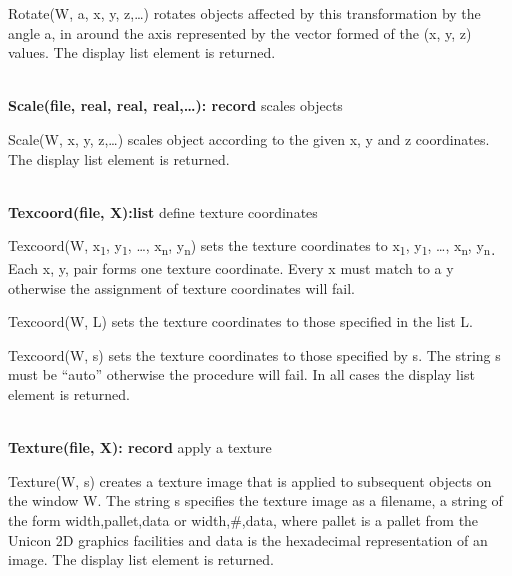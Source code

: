 \documentclass[letterpaper]{article}
\begin{document}
\bigskip

{
\textsf{Rotate(W, a, x, y, z,{\dots})} rotates objects affected by this transformation by the angle a, in around the
axis represented by the vector formed of the (x, y, z) values. The display list element is returned.}

\noindent\hrulefill\\
\noindent\textsf{\textbf{Scale(file, real, real, real,{\dots}): record}} \hfill
scales objects


\bigskip

\textsf{Scale(W, x, y, z,{\dots})} scales object according to the
given x, y and z coordinates. The display list element is returned.

\noindent\hrulefill\\
\noindent\textsf{\textbf{Texcoord(file, X):list}}
\hfill define texture coordinates


\bigskip

\textsf{Texcoord(W, x}\textsf{\textsubscript{1}}\textsf{, y}\textsf{\textsubscript{1}}\textsf{, {\dots},
x}\textsf{\textsubscript{n}}\textsf{, y}\textsf{\textsubscript{n}}\textsf{) }sets the texture coordinates to
\textsf{x}\textsf{\textsubscript{1}}\textsf{, y}\textsf{\textsubscript{1}}\textsf{, {\dots},
x}\textsf{\textsubscript{n}}\textsf{, y}\textsf{\textsubscript{n}}\texttt{\textsubscript{. }}Each x, y, pair forms one
texture coordinate. Every x must match to a y otherwise the assignment of texture coordinates will fail.

\textsf{Texcoord(W, L)} sets the texture coordinates to those specified in the list \textsf{L}.

\textsf{Texcoord(W, s) }sets the texture coordinates to those
specified by \textsf{s}. The string \textsf{s} must be
\textsf{{}``auto''} otherwise the procedure will fail. In all cases
the display list element is returned.

\noindent\hrulefill\\
\noindent\textsf{\textbf{Texture(file, X): record}} \hfill apply a texture


\bigskip

\textsf{Texture(W, s) }creates a texture image that is applied to
subsequent objects on the window \textsf{W}. The string \textsf{s}
specifies the texture image as a filename, a string of the form
\textsf{width,pallet,data} or \textsf{width,\#,data}, where pallet is
a pallet from the Unicon 2D graphics facilities and data is the
hexadecimal representation of an image. The display list element is
returned.
\end{document}
